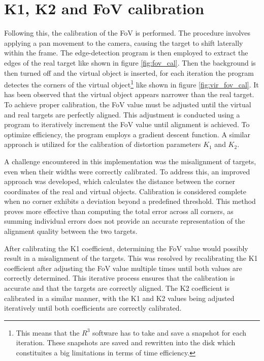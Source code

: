 \section{ K1, K2 and \ac{FoV} calibration} \label{sec:FoV calibration}

\noindent Following this, the calibration of the \ac{FoV} is performed. The procedure involves applying a pan movement 
to the camera, causing the target to shift laterally within the frame. The edge-detection program is 
then employed to extract the edges of the real target like shown in figure \ref{fig:fov_cal}. Then the background is 
then turned off and the virtual object is inserted, for each iteration the program detectes the corners of the virtual object\footnote{This means that the $R^3$ software has to take and save a snapshot for each iteration. These snapshots are saved and rewritten into the disk which constituites a big limitations in terms of time efficiency.} like shown in 
figure \ref{fig:vir_fov_cal}.  
It has been observed that the virtual object appears narrower than the real target. To achieve proper calibration, the \ac{FoV} value must be adjusted until the virtual and real targets are perfectly aligned. This adjustment is conducted using a program to iteratively increment the \ac{FoV} value until alignment is achieved. To optimize efficiency, the program employs a gradient descent function. A similar approach is utilized for the calibration of distortion parameters \( K_1 \) and \( K_2 \).

\noindent A challenge encountered in this implementation was the misalignment of targets, even when their widths were correctly calibrated. To address this, an improved approach was developed, which calculates the distance between the corner coordinates of the real and virtual objects. Calibration is considered complete when no corner exhibits a deviation beyond a predefined threshold. This method proves more effective than computing the total error across all corners, as summing individual errors does not provide an accurate representation of the alignment quality between the two targets.

\noindent After calibrating the K1 coefficient, determining the \ac{FoV} value would possibly result in a misalignment of the targets. This was resolved by recalibrating the K1 coefficient after adjusting the \ac{FoV} value multiple times until both values are correctly determined. This iterative process ensures that the calibration is accurate and that the targets are correctly aligned. The K2 coefficient is calibrated in a similar manner, with the K1 and K2 values being adjusted iteratively until both coefficients are correctly calibrated.

